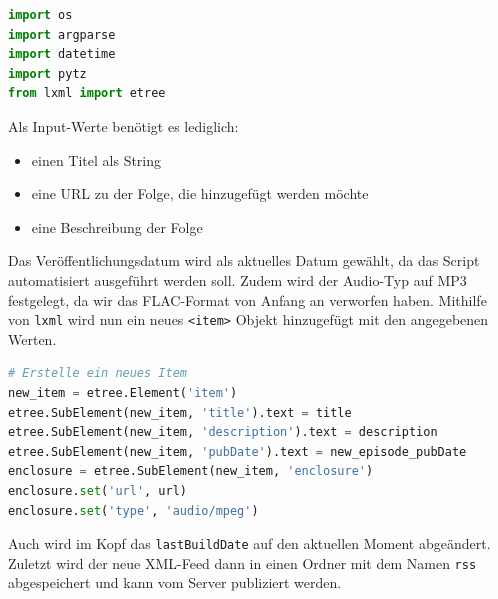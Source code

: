 \documentclass{article}
\begin{document}
\begin{lstlisting}[language=Python, caption=RSS-Feed Generator imports]
import os
import argparse
import datetime
import pytz
from lxml import etree
\end{lstlisting}

Als Input-Werte benötigt es lediglich:

\begin{itemize}
    \item einen Titel als String
    \item eine URL zu der Folge, die hinzugefügt werden möchte
    \item eine Beschreibung der Folge
\end{itemize}

Das Veröffentlichungsdatum wird als aktuelles Datum gewählt, da das Script automatisiert ausgeführt werden soll. Zudem wird der Audio-Typ auf MP3 festgelegt, da wir das FLAC-Format von Anfang an verworfen haben. Mithilfe von \texttt{lxml} wird nun ein neues \texttt{<item>} Objekt hinzugefügt mit den angegebenen Werten.

\begin{lstlisting}[language=Python, caption=Erstellen eines neuen Feed-Items]
# Erstelle ein neues Item
new_item = etree.Element('item')
etree.SubElement(new_item, 'title').text = title
etree.SubElement(new_item, 'description').text = description
etree.SubElement(new_item, 'pubDate').text = new_episode_pubDate
enclosure = etree.SubElement(new_item, 'enclosure')
enclosure.set('url', url)
enclosure.set('type', 'audio/mpeg')
\end{lstlisting}

Auch wird im Kopf das \texttt{lastBuildDate} auf den aktuellen Moment abgeändert. Zuletzt wird der neue XML-Feed dann in einen Ordner mit dem Namen \texttt{rss} abgespeichert und kann vom Server publiziert werden.
\end{document}
